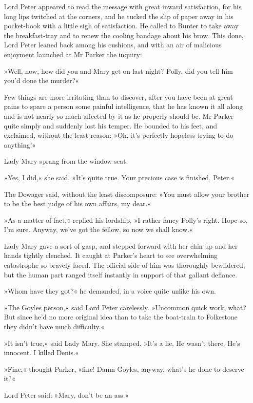 Lord Peter appeared to read the message with great inward satisfaction, for his long lips twitched at the corners, and he tucked the slip of paper away in his pocket-book with a little sigh of satisfaction. He called to Bunter to take away the breakfast-tray and to renew the cooling bandage about his brow. This done, Lord Peter leaned back among his cushions, and with an air of malicious enjoyment launched at Mr Parker the inquiry:

»Well, now, how did you and Mary get on last night? Polly, did you tell him you'd done the murder?«

Few things are more irritating than to discover, after you have been at great pains to spare a person some painful intelligence, that he has known it all along and is not nearly so much affected by it as he properly should be. Mr Parker quite simply and suddenly lost his temper. He bounded to his feet, and exclaimed, without the least reason: »Oh, it's perfectly hopeless trying to do anything!«

Lady Mary sprang from the window-seat.

»Yes, I did,« she said. »It's quite true. Your precious case is finished, Peter.«

The Dowager said, without the least discomposure: »You must allow your brother to be the best judge of his own affairs, my dear.«

»As a matter of fact,« replied his lordship, »I rather fancy Polly's right. Hope so, I'm sure. Anyway, we've got the fellow, so now we shall know.«

Lady Mary gave a sort of gasp, and stepped forward with her chin up and her hands tightly clenched. It caught at Parker's heart to see overwhelming catastrophe so bravely faced. The official side of him was thoroughly bewildered, but the human part ranged itself instantly in support of that gallant defiance.

»Whom have they got?« he demanded, in a voice quite unlike his own.

»The Goyles person,« said Lord Peter carelessly. »Uncommon quick work, what? But since he'd no more original idea than to take the boat-train to Folkestone they didn't have much difficulty.«

»It isn't true,« said Lady Mary. She stamped. »It's a lie. He wasn't there. He's innocent. I killed Denis.«

»Fine,« thought Parker, »fine! Damn Goyles, anyway, what's he done to deserve it?«

Lord Peter said: »Mary, don't be an ass.«

